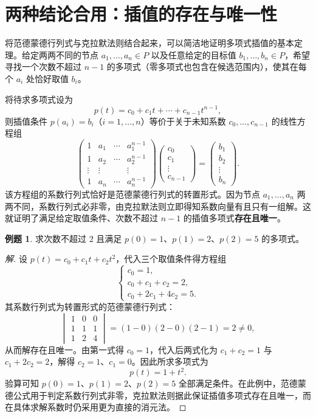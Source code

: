 \documentclass[UTF8, fontset=fandol, a4paper, 12pt]{ctexart}
\theoremstyle{definition}
\newtheorem{example}[definition]{例题}
\begin{document}
\section{两种结论合用：插值的存在与唯一性}

将范德蒙德行列式与克拉默法则结合起来，可以简洁地证明多项式插值的基本定理。给定两两不同的节点 $a_1,\ldots,a_n\in P$ 以及任意给定的目标值 $b_1,\ldots,b_n\in P$，希望寻找一个次数不超过 $n-1$ 的多项式（零多项式也包含在候选范围内），使其在每个 $a_i$ 处恰好取值 $b_i$。

将待求多项式设为
\[
 p(t)=c_0+c_1t+\cdots+c_{n-1}t^{n-1},
\]
则插值条件 $p(a_i)=b_i$（$i=1,\ldots,n$）等价于关于未知系数 $c_0,\ldots,c_{n-1}$ 的线性方程组
\[
 \begin{pmatrix}
 1&a_1&\cdots&a_1^{n-1}\\
 1&a_2&\cdots&a_2^{n-1}\\
 \vdots&\vdots&&\vdots\\
 1&a_n&\cdots&a_n^{n-1}
 \end{pmatrix}
 \begin{pmatrix}c_0\\c_1\\\vdots\\c_{n-1}\end{pmatrix}
 =
 \begin{pmatrix}b_1\\b_2\\\vdots\\b_n\end{pmatrix}.
\]
该方程组的系数行列式恰好是范德蒙德行列式的转置形式。因为节点 $a_1,\ldots,a_n$ 两两不同，系数行列式必非零，由克拉默法则立即得知系数向量有且只有一组解。这就证明了满足给定取值条件、次数不超过 $n-1$ 的插值多项式\textbf{存在且唯一}。

\begin{example}
求次数不超过 $2$ 且满足 $p(0)=1$、$p(1)=2$、$p(2)=5$ 的多项式。
\end{example}
\begin{proof}[解]
设 $p(t)=c_0+c_1t+c_2t^2$，代入三个取值条件得方程组
\[
 \begin{cases}
 c_0=1,\\
 c_0+c_1+c_2=2,\\
 c_0+2c_1+4c_2=5.
 \end{cases}
\]
其系数行列式为转置形式的范德蒙德行列式：
\[
 \begin{vmatrix}1&0&0\\1&1&1\\1&2&4\end{vmatrix}
 =(1-0)(2-0)(2-1)=2\ne0,
\]
从而解存在且唯一。由第一式得 $c_0=1$，代入后两式化为 $c_1+c_2=1$ 与 $c_1+2c_2=2$，解得 $c_2=1$、$c_1=0$。因此所求多项式为
\[
 \boxed{p(t)=1+t^2.}
\]
验算可知 $p(0)=1$、$p(1)=2$、$p(2)=5$ 全部满足条件。在此例中，范德蒙德公式用于判定系数行列式非零，克拉默法则据此保证插值多项式存在且唯一，而在具体求解系数时仍采用更为直接的消元法。
\end{proof}
\end{document}
